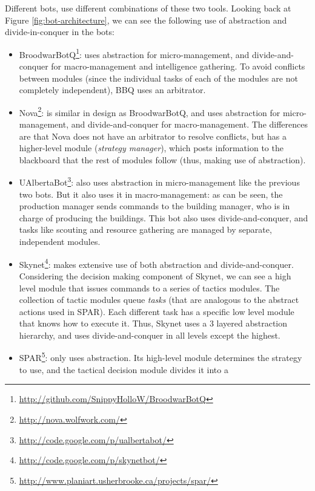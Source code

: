 \documentclass[journal]{IEEEtran}
\begin{document}
Different bots, use different combinations of these two tools. Looking back at Figure \ref{fig:bot-architecture}, we can see the following use of abstraction and divide-in-conquer in the bots:

\begin{itemize}
\item
  BroodwarBotQ\footnote{\url{http://github.com/SnippyHolloW/BroodwarBotQ}}:
  uses  abstraction for  micro-management, and  divide-and-conquer for
  macro-management  and  intelligence  gathering. To  avoid  conflicts
  between modules (since  the individual tasks of each  of the modules
  are not completely independent), BBQ uses an arbitrator.
\item  Nova\footnote{\url{http://nova.wolfwork.com/}}:  is similar  in
  design as  BroodwarBotQ, and uses  abstraction for micro-management,
  and  divide-and-conquer for  macro-management.  The differences  are
  that Nova does not have  an arbitrator to resolve conflicts, but has
  a  higher-level   module  ({\em  strategy   manager}),  which  posts
  information to the blackboard that the rest of modules follow (thus,
  making use of abstraction).
\item
  UAlbertaBot\footnote{\url{http://code.google.com/p/ualbertabot/}}:
  also  uses abstraction  in  micro-management like  the previous  two
  bots. But it  also uses it in macro-management: as  can be seen, the
  production manager sends commands to the building manager, who is in
  charge   of   producing   the   buildings.  This   bot   also   uses
  divide-and-conquer, and  tasks like scouting  and resource gathering
  are managed by separate, independent modules.
\item       Skynet\footnote{\url{http://code.google.com/p/skynetbot/}}:
  makes     extensive     use      of     both     abstraction     and
  divide-and-conquer.  Considering the  decision  making component  of
  Skynet, we  can see a  high level module  that issues commands  to a
  series of  tactics modules. The  collection of tactic  modules queue
  {\em  tasks} (that  are analogous  to the  abstract actions  used in
  SPAR).  Each different  task has  a specific  low level  module that
  knows how to  execute it. Thus, Skynet uses  a 3 layered abstraction
  hierarchy,  and uses  divide-and-conquer  in all  levels except  the
  highest.
\item
  SPAR\footnote{\url{http://www.planiart.usherbrooke.ca/projects/spar/}}:
  only uses abstraction. Its high-level module determines the strategy
  to  use,  and  the  tactical  decision  module  divides  it  into  a

\end{itemize}
\end{document}
